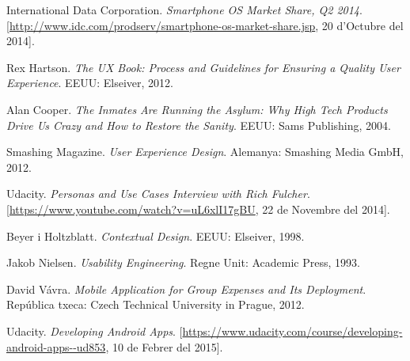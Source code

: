 \begin{thebibliography}{9}

International Data Corporation. \textit{Smartphone OS Market Share, Q2 2014}. [\url{http://www.idc.com/prodserv/smartphone-os-market-share.jsp}, 20 d'Octubre del 2014].

Rex Hartson. \textit{The UX Book: Process and Guidelines for Ensuring a Quality User Experience}. EEUU: Elseiver, 2012. %

Alan Cooper. \textit{The Inmates Are Running the Asylum: Why High Tech Products Drive Us Crazy and How to Restore the Sanity}. EEUU: Sams Publishing, 2004.

Smashing Magazine. \textit{User Experience Design}. Alemanya: Smashing Media GmbH, 2012. %

Udacity. \textit{Personas and Use Cases Interview with Rich Fulcher}. [\url{https://www.youtube.com/watch?v=uL6xlI17gBU}, 22 de Novembre del 2014]. 

Beyer i Holtzblatt. \textit{Contextual Design}. EEUU: Elseiver, 1998.

Jakob Nielsen. \textit{Usability Engineering}. Regne Unit: Academic Press, 1993.

David Vávra. \textit{Mobile Application for Group Expenses and Its Deployment}. República txeca: Czech Technical University in Prague, 2012.

Udacity. \textit{Developing Android Apps}. [\url{https://www.udacity.com/course/developing-android-apps--ud853}, 10 de Febrer del 2015]. 




\end{thebibliography}